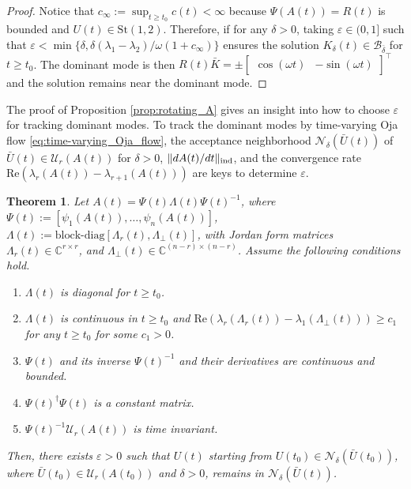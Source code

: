\documentclass[fleqn,10pt]{SICE_FES26}
\newtheorem{thm}{Theorem}
\begin{document}
\begin{proof}
    Notice that $c_{\infty} := \sup _{t\geq t_{0}} c(t) < \infty$ because $\Psi(A(t))=R(t)$ is bounded and $U(t) \in {\mathrm{St}}(1,2)$. 
    Therefore, if for any $\delta >0$, taking $\varepsilon  \in (0,1]$ such that $\varepsilon  < \min \{ \delta , \delta (\lambda _{1} - \lambda _{2})/\omega (1+c_{\infty}) \}$ ensures the solution $ K_{\delta}(t) \in {\mathcal{B}}_{\bar{\delta}}$ for $t\geq t_{0}$. 
    The dominant mode is then $R(t) \bar{K} = \pm \begin{bmatrix} \cos (\omega t) & -\sin (\omega t) \end{bmatrix} ^{\top}$ and the solution remains near the dominant mode. 
    \end{proof}

    The proof of Proposition \ref{prop:rotating_A} gives an insight into how to choose $\varepsilon$ for tracking dominant modes. 
    To track the dominant modes by time-varying Oja flow \eqref{eq:time-varying_Oja_flow}, the acceptance neighborhood ${\mathcal{N}}_{\delta} (\bar{U}(t))$ of $\bar{U}(t) \in {\mathcal{U}}_{r}(A(t))$ for $\delta >0$, $\| dA(t) /dt \| _{\rm ind}$, and the convergence rate ${\mathrm{Re}}(\lambda _{r}(A(t)) - \lambda _{r+1}(A(t)))$ are keys to determine $\varepsilon $.  
    

    \begin{thm}\label{thm:time_varying_tracking_performance}
    Let $A(t) = \Psi (t) \Lambda (t) \Psi (t) ^{-1} $, where $\Psi (t) :=[ \psi _{1} (A(t)),\dots , \psi _{n}(A(t)) ]$, $\Lambda (t) := \mbox{block-diag}[\Lambda _{r}(t) , \Lambda _{\perp}(t)]$, with Jordan form matrices $\Lambda _{r}(t) \in {\mathbb{C}}^{r \times r}$, and $\Lambda _{\perp} (t) \in {\mathbb{C}}^{(n-r) \times (n-r)}$. 
    Assume the following conditions hold. 
    \begin{enumerate}
    \item $\Lambda (t)$ is diagonal for $t\geq t_{0}$. 
    
    \item $\Lambda (t)$ is continuous in $t\geq t_{0}$ and ${\mathrm{Re}}(\lambda _{r} (\Lambda _{r}(t)) - \lambda _{1}(\Lambda _{\perp} (t))) \geq c_{1}$ for any $t \geq t_{0}$ for some $c_{1} >0$. 
    
    \item $\Psi (t)$ and its inverse $\Psi (t)^{-1}$ and their derivatives are continuous and bounded.  
    
    \item $\Psi (t)^{\dagger} \Psi (t)$ is a constant matrix. 
    
    \item $\Psi (t)^{-1} {\mathcal{U}}_{r}(A(t)) $ is time invariant. 
    
    \end{enumerate}
    Then, there exists $\varepsilon >0$ such that 
    $U(t)$ starting from $U(t_{0}) \in {\mathcal{N}}_{\delta} (\bar{U}(t_{0}))$, where $\bar{U}(t_{0}) \in {\mathcal{U}}_{r}(A(t_{0}))$ and $\delta >0$,  remains in ${\mathcal{N}}_{\delta} (\bar{U}(t))$. 
    \end{thm}
    
\end{document}
